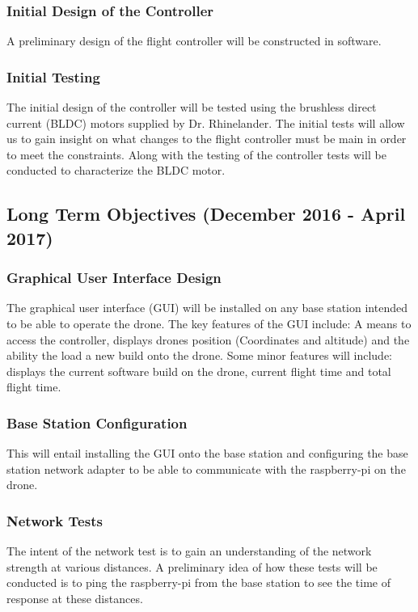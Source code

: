 \subsubsection{Initial Design of the Controller} 
A preliminary design of the flight controller will be constructed in software. 

\subsubsection{Initial Testing} 
The initial design of the controller will be tested using the brushless direct current (BLDC) motors  supplied by Dr. Rhinelander. The initial tests will allow us to gain insight on what changes to the flight controller must be main in order to meet the constraints. Along with the testing of the controller tests will be conducted to characterize the BLDC motor. 

\subsection{Long Term Objectives (December 2016 - April 2017)}
\subsubsection{Graphical User Interface Design}
The graphical user interface (GUI) will be installed on any base station intended to be able to operate the drone. The key features of the GUI include: A means to access the controller, displays drones position (Coordinates and altitude) and the ability the load a new build onto the drone. Some minor features will include: displays the current software build on the drone, current flight time and total flight time.
 
\subsubsection{Base Station Configuration}
This will entail installing the GUI onto the base station and configuring the base station network adapter to be able to communicate with the raspberry-pi on the drone. 

\subsubsection{Network Tests}
The intent of the network test is to gain an understanding of the network strength at various distances. A preliminary idea of how these tests will be conducted is to ping the raspberry-pi from the base station to see the time of response at these distances. 


